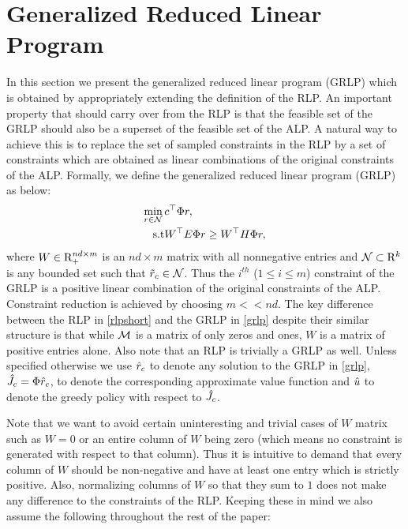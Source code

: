 \section{Generalized Reduced Linear Program}
In this section we present the generalized reduced linear program (GRLP) which is obtained by appropriately extending the definition of the RLP. An important property that should carry over from the RLP is that the feasible set of the GRLP should also be a superset of the feasible set of the ALP. A natural way to achieve this is to replace the set of sampled constraints in the RLP by a set of constraints which are obtained as linear combinations of the original constraints of the ALP. Formally, we define the generalized reduced linear program (GRLP) as below:
\begin{align}\label{grlp}
\begin{split}
\underset{r\in \N}{\min}\, &c^\top \Phi r,\\
\text{s.t}\mb & W^\top E\Phi r\geq W^\top H \Phi r, 
\end{split}
\end{align}
where $W \in \mathrm{R}_+^{nd\times m}$ is an $nd\times m$ matrix with all nonnegative entries and $\mathcal{N} \subset \mathrm{R}^k$ is any bounded set such that $\tilde{r}_c \in \mathcal{N}$. 
Thus the $i^{th}$ ($1\leq i\leq m$) constraint of the GRLP is a positive linear combination of the original constraints of the ALP. Constraint reduction is achieved by choosing $m<<nd$. The key difference between the RLP in \eqref{rlpshort} and the GRLP in \eqref{grlp} despite their similar structure is that while $\mathcal{M}$ is a matrix of only zeros and ones, $W$ is a matrix of positive entries alone. Also note that an RLP is trivially a GRLP as well. Unless specified otherwise we use $\hat{r}_c$ to denote any solution to the GRLP in \eqref{grlp}, $\hat{J}_c=\Phi \hat{r}_c$, to denote the corresponding approximate value function and $\hat{u}$ to denote the greedy policy with respect to $\hat{J}_c$.\par
Note that we want to avoid certain uninteresting and trivial cases of $W$ matrix such as $W=0$ or an entire column of $W$ being zero (which means no constraint is generated with respect to that column). Thus it is intuitive to demand that every column of $W$ should be non-negative and have at least one entry which is strictly positive. Also, normalizing columns of $W$ so that they sum to $1$ does not make any difference to the constraints of the RLP. Keeping these in mind we also assume the following throughout the rest of the paper:
